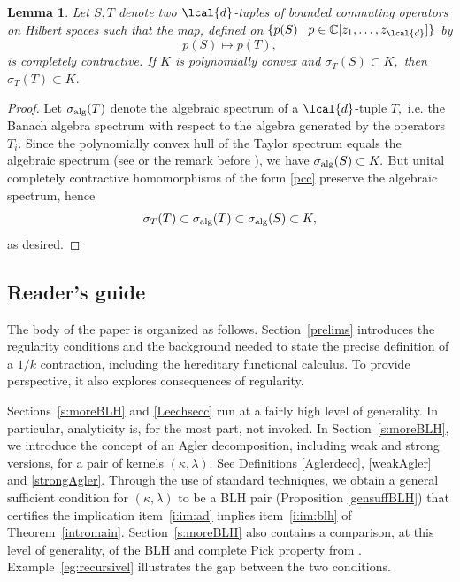 \documentclass[a4paper,reqno,index]{amsart}
\numberwithin{equation}{section}
\newtheorem{lemma}[theorem]{Lemma}
\newcommand{\CC}{\mathbb{C}}
\newcommand{\specT}{\sigma_T}  %
\newcommand{\genk}{\kappa} %
\newcommand{\genl}{\lambda} %
\theoremstyle{definition}
\begin{document}
 


\begin{lemma}\label{Taylorinclusion}
Let $S, T$ denote two $\lcal{d}$-tuples of bounded commuting operators on Hilbert spaces such that
the map, defined on $\{p(S)\mid p\in \CC[z_1,\dots,z_\lcal{d}]\}$ by 
\begin{equation}\label{pcc}
    p(S)\mapsto p(T), 
\end{equation} 
is completely contractive. If $K$ is polynomially convex and $\specT(S)\subset K,$ then $\specT(T)\subset K.$
\end{lemma}
\begin{proof}
Let $\sigma_{\textup{alg}}(T)$ denote the algebraic spectrum of a $\lcal{d}$-tuple $T,$ i.e. the Banach algebra spectrum with respect to the algebra generated by the operators $T_i.$ Since the polynomially convex hull of the Taylor spectrum equals the algebraic spectrum (see \cite{Curtosurveyref} or the remark before \cite[Lemma 1.3]{Wrobel}), we have $\sigma_{\textup{alg}}(S)\subset K.$ But unital completely contractive homomorphisms of the form \eqref{pcc} preserve the algebraic spectrum, hence \[\specT(T)\subset \sigma_{\textup{alg}}(T)\subset  \sigma_{\textup{alg}}(S)\subset K,\]
as desired. 
\end{proof}


\subsection{Reader's guide} 
 The body of the paper is organized as follows. 
 Section~\ref{prelims} introduces the regularity
 conditions and the background needed to state the
 precise definition of a $1/k$ contraction, including the hereditary functional calculus. To provide
 perspective, it also explores consequences of regularity.
  \par
 Sections~\ref{s:moreBLH} and \ref{Leechsecc} run at
 a fairly high level of generality. In particular, analyticity
 is, for the most part, not invoked.  {In Section~\ref{s:moreBLH}, we introduce the concept of an Agler decomposition, including weak and strong versions, for a pair of kernels $(\genk,\genl).$ See Definitions \ref{Aglerdecc}, \ref{weakAgler} and \ref{strongAgler}. Through the use of standard techniques, we obtain a general sufficient condition for $(\genk,\genl)$ to be a BLH pair (Proposition \ref{gensuffBLH}) that
certifies the implication item~\ref{i:im:ad} implies item~\ref{i:im:blh} of Theorem~\ref{intromain}.}
Section~\ref{s:moreBLH} also contains
 a comparison, at this level of generality, of the
 BLH and complete Pick property from \cite{Shimorin}.
   Example~\ref{eg:recursivel}
 illustrates the gap between the two conditions.
\end{document}

